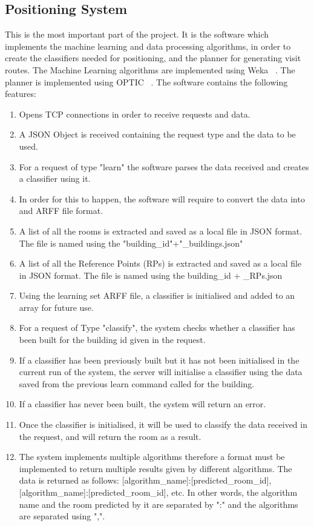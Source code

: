 \subsection{Positioning System}
This is the most important part of the project. It is the software which implements the machine learning and data processing algorithms, in order to create the classifiers needed for positioning, and the planner for generating visit routes. The Machine Learning algorithms are implemented using Weka ~\cite{Weka}. The planner is implemented using OPTIC ~\cite{OPTIC}. The software contains the following features:
\begin{enumerate}
\item Opens TCP connections in order to receive requests and data.
\item A JSON Object is received containing the request type and the data to be used.
\item For a request of type "learn" the software parses the data received and creates a classifier using it.
\item In order for this to happen, the software will require to convert the data into and ARFF file format.
\item A list of all the rooms is extracted and saved as a local file in JSON format. The file is named using the "building\_id"+"\_buildings.json"
\item A list of all the Reference Points (RPs) is extracted and saved as a local file in JSON format. The file is named using the building\_id + \_RPs.json
\item Using the learning set ARFF file, a classifier is initialised and added to an array for future use.
\item For a request of Type "classify", the system checks whether a classifier has been built for the building id given in the request.
\item If a classifier has been previously built but it has not been initialised in the current run of the system, the server will initialise a classifier using the data saved from the previous learn command called for the building.
\item If a classifier has never been built, the system will return an error.
\item Once the classifier is initialised, it will be used to classify the data received in the request, and will return the room as a result.
\item The system implements multiple algorithms therefore a format must be implemented to return multiple results given by different algorithms. The data is returned as follows: [algorithm\_name]:[predicted\_room\_id],[algorithm\_name]:[predicted\_room\_id], etc. In other words, the algorithm name and the room predicted by it are separated by ":" and the algorithms are separated using ",".

\end{enumerate}
